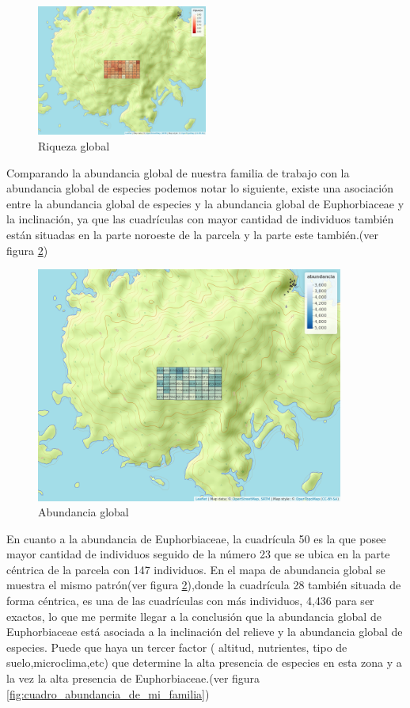 \documentclass[11pt,]{article}
\begin{document}
\begin{figure}
\centering
\includegraphics[width=0.50000\textwidth]{mapa_cuadros_riq_global.png}
\caption{\label{fig:cuadro_riqueza_global}Riqueza global}
\end{figure}

Comparando la abundancia global de nuestra familia de trabajo con la
abundancia global de especies podemos notar lo siguiente, existe una
asociación entre la abundancia global de especies y la abundancia global
de Euphorbiaceae y la inclinación, ya que las cuadrículas con mayor
cantidad de individuos también están situadas en la parte noroeste de la
parcela y la parte este también.(ver figura
\ref{fig:cuadro_de_abundancia_global})

\begin{figure}
\centering
\includegraphics[width=0.90000\textwidth]{mapa_cuadros_abun_global.png}
\caption{\label{fig:cuadro_de_abundancia_global}Abundancia global}
\end{figure}

En cuanto a la abundancia de Euphorbiaceae, la cuadrícula 50 es la que
posee mayor cantidad de individuos seguido de la número 23 que se ubica
en la parte céntrica de la parcela con 147 individuos. En el mapa de
abundancia global se muestra el mismo patrón(ver figura
\ref{fig:cuadro_de_abundancia_global}),donde la cuadrícula 28 también
situada de forma céntrica, es una de las cuadrículas con más individuos,
4,436 para ser exactos, lo que me permite llegar a la conclusión que la
abundancia global de Euphorbiaceae está asociada a la inclinación del
relieve y la abundancia global de especies. Puede que haya un tercer
factor ( altitud, nutrientes, tipo de suelo,microclima,etc) que
determine la alta presencia de especies en esta zona y a la vez la alta
presencia de Euphorbiaceae.(ver figura
\ref{fig:cuadro_abundancia_de_mi_familia})
\end{document}
